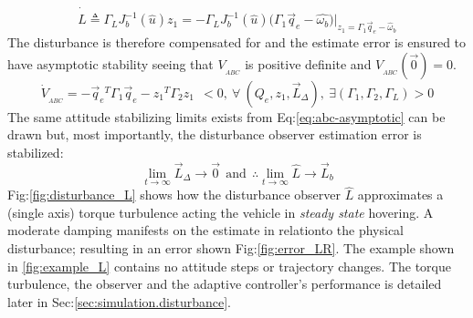 \begin{equation}\label{eq:asymptotic-disturbance}
\dot{\hat{L}}\triangleq\Gamma_L J_b^{-1}(\hat{u})z_1=-\Gamma_L J_b^{-1}(\hat{u})\big(\Gamma_1\vec{q}_e-\hat{\omega_b}\big)\Big|_{z_1=\Gamma_1\vec{q}_e-\hat{\omega}_b}
\end{equation}
The disturbance is therefore compensated for and the estimate error is ensured to have asymptotic stability seeing that $V_{_{ABC}}$ is positive definite and $V_{_{ABC}}(\vec{0})=0$.
\begin{equation}\label{eq:abc-asymptotic}
\dot{V}_{_{ABC}}=-\vec{q}_e\text{}^T\Gamma_1\vec{q}_e-z_1\text{}^T\Gamma_2z_1~~<0,~\forall~(Q_e,z_1,\vec{L}_\Delta),~\exists(\Gamma_1,\Gamma_2,\Gamma_L)>0
\end{equation}
The same attitude stabilizing limits exists from Eq:\ref{eq:abc-asymptotic} can be drawn but, most importantly, the disturbance observer estimation error is stabilized:
\begin{subequations}
\begin{equation}
\underset{t\rightarrow\infty}{\lim}\vec{L}_{\Delta}\rightarrow \vec{0}~~\text{and}~~
\therefore\underset{t\rightarrow\infty}{\lim}\hat{L}\rightarrow\vec{L}_b
\end{equation}
\end{subequations}
Fig:\ref{fig:disturbance_L} shows how the disturbance observer $\hat{L}$ approximates a (single axis) torque turbulence acting the vehicle in \emph{steady state} hovering. A moderate damping manifests on the estimate in relationto the physical disturbance; resulting in an error shown Fig:\ref{fig:error_LR}. The example shown in \ref{fig:example_L} contains no attitude steps or trajectory changes. The torque turbulence, the observer and the adaptive controller's performance is detailed later in Sec:\ref{sec:simulation.disturbance}.
